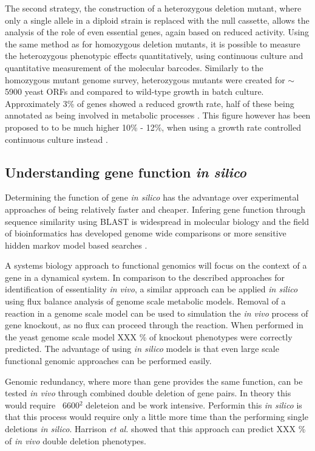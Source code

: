 The second strategy, the construction of a heterozygous deletion mutant, where only a single allele in a diploid strain is replaced with the null cassette, allows the analysis of the role of even essential genes, again based on reduced activity. Using the same method as for homozygous deletion mutants, it is possible to measure the heterozygous phenotypic effects quantitatively, using continuous culture and quantitative measurement of the molecular barcodes. Similarly to the homozygous mutant genome survey, heterozygous mutants were created for $\sim$5900 yeast ORFs and compared to wild-type growth in batch culture. Approximately 3\% of genes showed a reduced growth rate, half of these being annotated as being involved in metabolic processes \cite{deutschbauer2005}. This figure however has been proposed to to be much higher 10\% - 12\%, when using a growth rate controlled continuous culture instead \cite{papp2006}.

\subsection{Understanding gene function \emph{in silico}}

Determining the function of gene \emph{in silico} has the advantage over experimental approaches of being relatively faster and cheaper. Infering gene function through sequence similarity using BLAST \cite{blast} is widespread in molecular biology and the field of bioinformatics has developed genome wide comparisons \cite{blat} or more sensitive hidden markov model based searches \cite{hmmer}.

A systems biology approach to functional genomics will focus on the context of a gene in a dynamical system. In comparison to the described approaches for identification of essentiality \emph{in vivo}, a similar approach can be applied \emph{in silico} using flux balance analysis of genome scale metabolic models. Removal of a reaction in a genome scale model can be used to simulation the \emph{in vivo} process of gene knockout, as no flux can proceed through the reaction. When performed in the yeast genome scale model XXX \% of knockout phenotypes were correctly predicted. The advantage of using \emph{in silico} models is that even large scale functional genomic approaches can be performed easily. 

Genomic redundancy, where more than gene provides the same function, can be tested \emph{in vivo} through combined double deletion of gene pairs. In theory this would require ~6600$^2$ deleteion and be work intensive. Performin this \emph{in silico} is that this process would require only a little more time than the performing single deletions \emph{in silico}. Harrison \emph{et al.} \cite{double_deletion} showed that this approach can predict XXX \% of \emph{in vivo} double deletion phenotypes.

